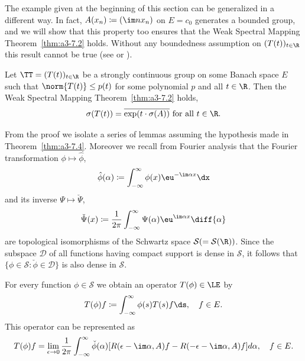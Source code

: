 The example given at the beginning of this section can be generalized in a different way.
In fact, $A(x_{n}) \coloneqq (\im nx_{n})$ on $E = c_{0}$ generates a bounded group, and we will show that this property too ensures that the Weak Spectral Mapping Theorem~\ref{thm:a3-7.2} holds.
Without any boundedness assumption on $(T(t))_{t\in\R}$ this result cannot be true (see \textcite[Sec.23.16]{hillephillips:1957} or \textcite{wolff:1981}).
\begin{theorem}\label{thm:a3-7.4}
Let $\TT = (T(t))_{t\in\R}$ be a strongly continuous group on some Banach space $E$ such that $\norm{T(t)} \leq p(t)$ for some polynomial $p$ and all $t \in \R$.
Then the Weak Spectral Mapping Theorem~\ref{thm:a3-7.2} holds, \ie 
\[
\sigma(T(t)) = \overline{\exp(t\cdot\sigma(A))} \text{ for all } t \in \R .
\]
\end{theorem}
From the proof we isolate a series of lemmas assuming the hypothesis made in Theorem~\ref{thm:a3-7.4}.
Moreover we recall from Fourier analysis that the Fourier transformation $\phi \mapsto \hat{\phi}$,
\[
\hat{\phi}(\alpha) \coloneqq \int_{-\infty}^{\infty} \phi(x)\eu^{-\im\alpha x} \dx
\]
and its inverse $\Psi \mapsto \check{\Psi}$,
\[
\check{\Psi}(x) \coloneqq \frac{1}{2\pi}\int_{-\infty}^{\infty}\Psi(\alpha)\eu^{\im\alpha x} 				\diff{\alpha}
\]
are topological isomorphisms of the Schwartz space $\mathcal{S} ( = \mathcal{S}(\R))$.
Since the subspace $\mathcal{D}$ of all functions having compact support is dense in $\mathcal{S}$, it follows that $\{\phi \in \mathcal{S} \colon \check{\phi} \in \mathcal{D}\}$ is also dense in $\mathcal{S}$.
\begin{lemma}\label{lem:a3-7.5}
For every function $\phi \in \mathcal{S}$ we obtain an operator $T(\phi) \in \LE$ by
\[
T(\phi)f \coloneqq \int_{-\infty}^{\infty} \phi(s)T(s)f \ds, \quad f \in E .
\]
This operator can be represented as
\begin{equation}\label{eq:a3-7.3}
T(\phi)f = \lim_{\epsilon\to 0} \frac{1}{2\pi}\int_{-\infty}^{\infty} \check{\phi}(\alpha)[R(\epsilon-\im\alpha,A)f - R(-\epsilon-\im\alpha,A)f] d\alpha, \quad f \in E .
\end{equation}
\end{lemma}

